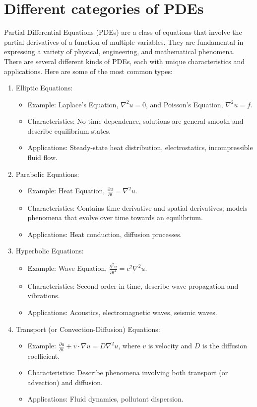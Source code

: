 \documentclass[a4paper,12pt]{article} %
\begin{document}
\section{\textbf{Different categories of PDEs}}

Partial Differential Equations (PDEs) are a class of equations that involve the partial derivatives of a function of multiple variables. They are fundamental in expressing a variety of physical, engineering, and mathematical phenomena. There are several different kinds of PDEs, each with unique characteristics and applications. Here are some of the most common types:

\begin{enumerate}
\item Elliptic Equations:
\begin{itemize}
   \item Example: Laplace's Equation, \(\nabla^2 u = 0\), and Poisson's Equation, \(\nabla^2 u = f\).
   \item Characteristics: No time dependence, solutions are general 
   smooth and describe equilibrium states.
   \item Applications: Steady-state heat distribution, electrostatics, incompressible fluid flow.
\end{itemize}
\item Parabolic Equations:
\begin{itemize}
   \item Example: Heat Equation, \(\frac{\partial u}{\partial t} = \nabla^2 u\).
   \item Characteristics: Contains time derivative and spatial derivatives; models phenomena that evolve over time towards an equilibrium.
   \item Applications: Heat conduction, diffusion processes.
\end{itemize}
\item Hyperbolic Equations:
\begin{itemize}
   \item Example: Wave Equation, \(\frac{\partial^2 u}{\partial t^2} = c^2 \nabla^2 u\).
   \item Characteristics: Second-order in time, describe wave propagation and vibrations.
   \item Applications: Acoustics, electromagnetic waves, seismic waves.
\end{itemize}

\item Transport (or Convection-Diffusion) Equations:
\begin{itemize}
   \item Example: \(\frac{\partial u}{\partial t} + v \cdot \nabla u = D \nabla^2 u\), where \(v\) is velocity and \(D\) is the diffusion coefficient.
   \item Characteristics: Describe phenomena involving both transport (or advection) and diffusion.
   \item Applications: Fluid dynamics, pollutant dispersion.
\end{itemize}


\end{enumerate}
\end{document}
